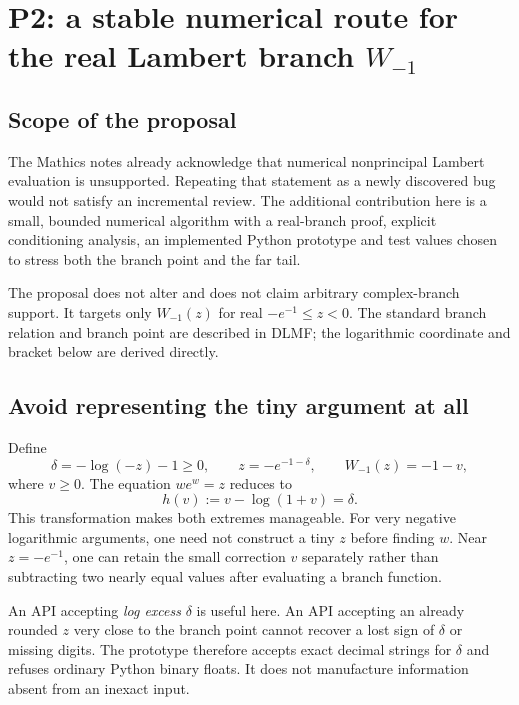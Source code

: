 \documentclass[11pt,letterpaper]{article}
\newcommand{\code}[1]{\texttt{\detokenize{#1}}}
\begin{document}
\section{P2: a stable numerical route for the real Lambert branch \texorpdfstring{$W_{-1}$}{W minus one}}
\subsection{Scope of the proposal}
The Mathics notes already acknowledge that numerical nonprincipal Lambert evaluation is unsupported. Repeating that statement as a newly discovered bug would not satisfy an incremental review. The additional contribution here is a small, bounded numerical algorithm with a real-branch proof, explicit conditioning analysis, an implemented Python prototype and test values chosen to stress both the branch point and the far tail.\cite{mathicsdocs,mathicscore}

The proposal does not alter \code{System`ProductLog} and does not claim arbitrary complex-branch support. It targets only $W_{-1}(z)$ for real $-e^{-1}\le z<0$. The standard branch relation and branch point are described in DLMF; the logarithmic coordinate and bracket below are derived directly.\cite{dlmflambert}

\subsection{Avoid representing the tiny argument at all}
Define
\[
 \delta=-\log(-z)-1\ge0,\qquad z=-e^{-1-\delta},\qquad
 W_{-1}(z)=-1-v,
\]
where $v\ge0$. The equation $we^w=z$ reduces to
\begin{equation}
 h(v):=v-\log(1+v)=\delta.
 \label{eq:lambert-phase}
\end{equation}
This transformation makes both extremes manageable. For very negative logarithmic arguments, one need not construct a tiny $z$ before finding $w$. Near $z=-e^{-1}$, one can retain the small correction $v$ separately rather than subtracting two nearly equal values after evaluating a branch function.

An API accepting \emph{log excess} $\delta$ is useful here. An API accepting an already rounded $z$ very close to the branch point cannot recover a lost sign of $\delta$ or missing digits. The prototype therefore accepts exact decimal strings for $\delta$ and refuses ordinary Python binary floats. It does not manufacture information absent from an inexact input.
\end{document}
